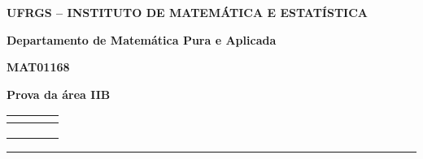 \documentclass[10pt,a4paper]{article}%
\begin{document}
\begin{minipage}[l]{11.4cm}

     {\bf UFRGS -- INSTITUTO DE MATEMÁTICA E ESTATÍSTICA}

    {\bf Departamento de Matemática Pura e Aplicada}
  
   {\bf MAT01168}

    {\bf Prova da área IIB}
\end{minipage}\hfill\begin{minipage}{5.75cm}
    \begin{tabular}{|c|c|c|c|}  \hline
        {\bf } & {\bf }& {\bf }&   {\bf }\!\! \\
        \hline
         \hline \hspace{1cm} & \hspace{1cm}   & \hspace{1cm}  & \hspace{1cm} \\
        &&& \\

        &&& \\
        \hline
    \end{tabular}
\end{minipage}

\vspace{0.2cm} \noindent \rule {17.9cm}{0.05cm}

\linespread{0.5}
\end{document}
